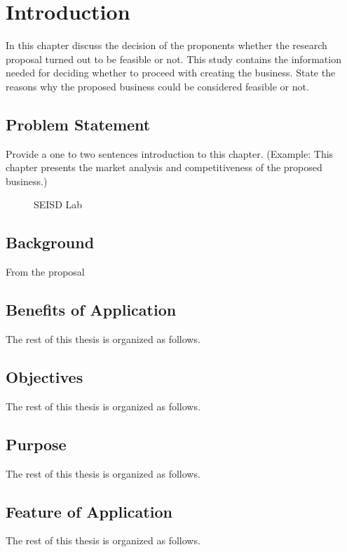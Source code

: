 \chapter{Introduction}\label{intro}
In this chapter discuss the decision of the proponents whether the research proposal turned out to be feasible or not. This study contains the information needed for deciding whether to proceed with creating the business. State the reasons why the proposed business could be considered feasible or not.

\section{Problem Statement}
Provide a one to two sentences introduction to this chapter. (Example: This chapter presents the market analysis and competitiveness of the proposed business.)
\begin{figure}
	\caption
	{SEISD Lab \label{fig:example}}
\end{figure}


\section{Background}
From the proposal

\section{Benefits of Application} 
The rest of this thesis is organized as follows.

\section{Objectives} 
The rest of this thesis is organized as follows.

\section{Purpose} 
The rest of this thesis is organized as follows.

\section{Feature of Application} 
The rest of this thesis is organized as follows.

